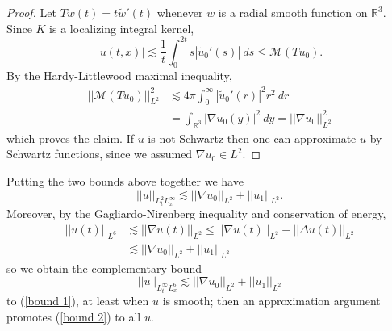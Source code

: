 \documentclass[10pt]{article}
\newcommand{\RR}{\mathbb{R}}
\theoremstyle{definition}
\begin{document}
\begin{proof}
Let $Tw(t) = t\tilde w'(t)$ whenever $w$ is a radial smooth function on $\RR^3$.
Since $K$ is a localizing integral kernel,
$$|u(t, x)| \lesssim \frac{1}{t} \int_0^{2t} s |\tilde u_0'(s)| ~ds \leq \mathcal M(Tu_0).$$
By the Hardy-Littlewood maximal inequality,
\begin{align*}
||\mathcal M(Tu_0)||_{L^2}^2 &\lesssim 4\pi \int_0^\infty |\tilde u_0'(r)|^2 r^2~dr \\
&= \int_{\RR^3} |\nabla u_0(y)|^2 ~dy = ||\nabla u_0||_{L^2}^2
\end{align*}
which proves the claim. If $u$ is not Schwartz then one can approximate $u$ by Schwartz functions, since we assumed $\nabla u_0 \in L^2$.
\end{proof}

Putting the two bounds above together we have
\begin{equation}
\label{bound 1}
||u||_{L^2_tL^\infty_x} \lesssim ||\nabla u_0||_{L^2} + ||u_1||_{L^2}.
\end{equation}
Moreover, by the Gagliardo-Nirenberg inequality and conservation of energy,
\begin{align*}
||u(t)||_{L^6} &\lesssim ||\nabla u(t)||_{L^2} \leq ||\nabla u(t)||_{L^2} + ||\Delta u(t)||_{L^2}\\
&\lesssim ||\nabla u_0||_{L^2} + ||u_1||_{L^2}
\end{align*}
so we obtain the complementary bound
\begin{equation}
\label{bound 2}
||u||_{L^\infty_t L^6_x} \lesssim ||\nabla u_0||_{L^2} + ||u_1||_{L^2}
\end{equation}
to (\ref{bound 1}), at least when $u$ is smooth; then an approximation argument promotes (\ref{bound 2}) to all $u$.
\end{document}
